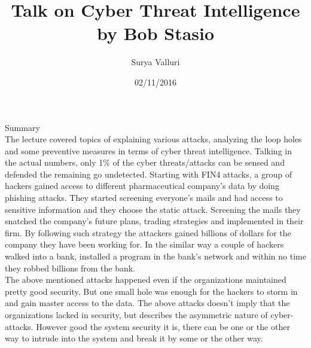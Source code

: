 \documentclass{article}
\title{Talk on Cyber Threat Intelligence by Bob Stasio}
\author{Surya Valluri}
\date{02/11/2016}
\begin{document}
\maketitle


                                                                                             Summary\\

The lecture covered topics of explaining various attacks, analyzing the loop holes and some preventive measures in terms of cyber threat intelligence. Talking in the actual numbers, only 1\% of the cyber threats/attacks can be sensed and defended the remaining go undetected. Starting with FIN4 attacks, a group of hackers gained access to different pharmaceutical company’s data by doing phishing attacks. They started screening everyone’s mails and had access to sensitive information and they choose the static attack. Screening the mails they snatched the company’s future plans, trading strategies and implemented in their firm. By following such strategy the attackers gained billions of dollars for the company they have been working for. In the similar way a couple of hackers walked into a bank, installed a program in the bank’s network and within no time they robbed billions from the bank.\\

The above mentioned attacks happened even if the organizations maintained pretty good security. But one small hole was enough for the hackers to storm in and gain master access to the data. The above attacks doesn’t imply that the organizations lacked in security, but describes the asymmetric nature of cyber-attacks. However good the system security it is, there can be one or the other way to intrude into the system and break it by some or the other way.\\
\end{document}
